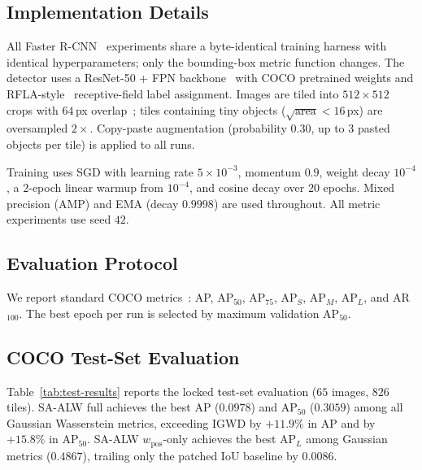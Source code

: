 \subsection{Implementation Details}
\label{sec:exp-impl}

All Faster R-CNN~\cite{ren2015faster} experiments share a byte-identical training harness with
identical hyperparameters; only the bounding-box metric function changes.
The detector uses a ResNet-50 + FPN backbone~\cite{he2016resnet,lin2017fpn}
with COCO pretrained weights and RFLA-style~\cite{xu2022rfla} receptive-field
label assignment. Images are tiled into $512\times512$ crops with $64$\,px
overlap~\cite{akyon2022sahi}; tiles containing tiny objects
($\sqrt{\text{area}}<16$\,px) are oversampled $2\times$. Copy-paste
augmentation (probability $0.30$, up to $3$ pasted objects per tile) is
applied to all runs.

Training uses SGD with learning rate $5\times10^{-3}$, momentum $0.9$,
weight decay $10^{-4}$, a $2$-epoch linear warmup from $10^{-4}$, and cosine
decay over $20$ epochs. Mixed precision (AMP) and EMA (decay $0.9998$) are
used throughout. All metric experiments use seed $42$.

\subsection{Evaluation Protocol}
\label{sec:exp-eval}

We report standard COCO metrics~\cite{lin2014coco}: AP, AP$_{50}$, AP$_{75}$,
AP$_{S}$, AP$_{M}$, AP$_{L}$, and AR$_{100}$. The best epoch per run is
selected by maximum validation AP$_{50}$.

\subsection{COCO Test-Set Evaluation}
\label{sec:exp-test}

Table~\ref{tab:test-results} reports the locked test-set evaluation ($65$
images, $826$ tiles). SA-ALW full achieves the best AP ($0.0978$) and
AP$_{50}$ ($0.3059$) among all Gaussian Wasserstein metrics, exceeding IGWD
by $+11.9\%$ in AP and by $+15.8\%$ in AP$_{50}$. SA-ALW $w_{\text{pos}}$-only
achieves the best AP$_{L}$ among Gaussian metrics ($0.4867$), trailing only
the patched IoU baseline by $0.0086$.

